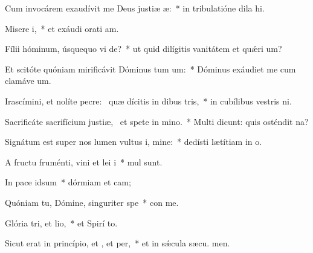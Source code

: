 \item Cum invocárem exaudívit me Deus justiæ æ:~* in tribulatióne dila hi.
\item Misere i,~* et exáudi orati am.
\item Fílii hóminum, úsquequo vi de?~* ut quid dilígitis vanitátem et quǽri um?
\item Et scitóte quóniam mirificávit Dóminus tum um:~* Dóminus exáudiet me cum clamáve  um.
\item Irascímini, et nolíte pecre:~\pscross{} quæ dícitis in dibus tris,~* in cubílibus vestris ni.
\item Sacrificáte sacrifícium justiæ,~\pscross{} et spete in mino.~* Multi dicunt: quis osténdit  na?
\item Signátum est super nos lumen vultus i, mine:~* dedísti lætítiam in  o.
\item A fructu fruménti, vini et lei i~* mul sunt.
\item In pace  idsum~* dórmiam et cam;
\item Quóniam tu, Dómine, singuriter  spe~* con me.
\item Glória tri, et lio,~* et Spirí to.
\item Sicut erat in princípio, et , et per,~* et in sǽcula sæcu. men.
